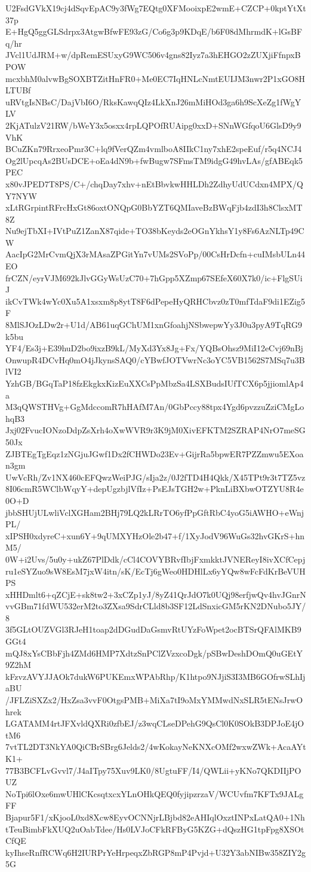 U2FsdGVkX19cj4dSqvEpAC9y3fWg7EQtg0XFMooixpE2wmE+CZCP+0kptYtXt37p
E+HgQ5ggGLSdrpx3AtgwBfwFE93zG/Co6g3p9KDqE/b6F08dMhrmdK+lGsBFq/hr
JVcl1UdJRM+w/dpRemESUxyG9WC506v4gns82Iyz7a3hEHGO2zZUXjiFfnpxBPOW
mcxbhM0alvwBgSOXBTZitHnFR0+Me0EC7IqHNLcNmtEUIJM3nwr2P1xGO8HLTUBf
uRVtgIsNBsC/DajVbI6O/RksKawqQIz4LkXnJ26mMiHOd3ga6h9ScXeZg1fWgYLV
2KjATulzV21RW/bWeY3x5osxx4rpLQPOfRUAipg0xxD+SNnWGfqoU6GlsD9y9VhK
BCuZKn79RrxeoPmr3C+lq9fVerQZm4vmlboA8IIkC1ny7xhE2speEuf/r5q4NCJ4
Og2lUpcqAs2BUsDCE+oEa4dN9b+fwBugw7SFmsTM9idgG49hvLAs/gfABEqk5PEC
x80vJPED7T8PS/C+/chqDay7xhv+nEtBbvkwHHLDh2ZdhyUdUCdxn4MPX/QY7NYW
xLtRGrpintRFrcHxGt86oxtONQpG0BbYZT6QMIaveBzBWqFjb4zdI3h8ClsxMT8Z
Nu9ejTbXI+IVtPuZ1ZanX87qide+TO38bKeyds2eOGnYkhsY1y8Fs6AzNLTp49CW
AacIpG2MrCvmQjX3rMAsaZPGitYn7vUMs2SVoPp/00CsHrDcfn+cuIMsbULn44EO
frCZN/eyrVJM692kJlvGGyWsUzC70+7hGpp5XZmp67SEfeX60X7k0/ic+FlgSUiJ
ikCvTWk4wYc0Xu5A1xsxm8p8ytT8F6dPepeHyQRHCbvz0zT0mfTdaF9di1EZig5F
8MlSJOzLDw2r+U1d/AB61uqGChUM1xnGfoahjNSbwepwYy3J0u3pyA9TqRG9k5bu
YF4/Es3j+E39huD2bo9ixzB9kL/MyXd3Yx8Jg+Fx/YQBsOhsz9MiI12eCvj69nBj
OnwupR4DCvHq0mO4jJkynsSAQ0/cYBwfJOTVwrNc3oYC5VB1562S7MSq7u3BlVI2
YzhGB/BGqTaP18fzEkgkxKizEuXXCsPpMbzSa4LSXBudsIUfTCX6p5jjiomlAp4a
M3qQWSTHVg+GgMdccomR7hHAfM7An/0GbPccy88tpx4Ygd6pvzzuZziCMgLohqB3
Jxj02FvucIONzoDdpZsXrh4oXwWVR9r3K9jM0XivEFKTM2SZRAP4NrO7meSG50Jx
ZJBTEgTgEqz1zNGjuJGwf1Dx2fCHWDo23Ev+GijrRa5bpwER7PZZmwu5EXoan3gm
UwVcRh/Zv1NX460cEFQwzWeiPJG/sIja2z/0J2fTD4H4Qkk/X45TPt9r3t7TZ5vz
8I06cmR5WClbWqyY+depUgzbjlVfIz+PsEJsTGH2w+PknLiBXbwOTZYU8R4e0O+D
jbbSHUjULwliVclXGHam2BHj79LQ2kLRrTO6yfPpGftRbC4yoG5iAWHO+eWnjPL/
xIPSH0xdyreC+xun6Y+9qUMXYHzOle2b47+f/1XyJodV96WuGs32hvGKrS+hnM5/
0W+i2Uvs/5u0y+ukZ67PlDdk/cCl4COVYBRvfIbjFxmkktJVNEReyI8ivXCfCepj
ru1eSYZuo9sW8EsM7jxW4itn/sK/EcTj6gWeo0HDHlLx6yYQw8wFcFdKrBeVUHPS
xHHDmlt6+qZCjE+sk8tw2+3xCZp1yJ/8yZ41QrJdO7k0UQj98erfjwQv4hvJGnrN
vvGBm71fdWU532erM2to3ZXsa9SdrCLld8b3SF12LdSnxicGM5rKN2DNubo5JY/8
3f5GLtOUZVGl3RJeH1toap2dDGudDaGsmvRtUYzFoWpet2ocBTSrQFAlMKB9GGt4
mQJ8xYsCBbFjh4ZMd6HMP7XdtzSnPClZVzxcoDgk/pSBwDeshDOmQ0uGEtY9Z2hM
kFzvzAVYJJAOk7dukW6PUKEmxWPAbRhp/K1htpo9NJjiS3I3MB6GOfrwSLhIjaBU
/JFLZiSXZx2/HxZsa3vvF0OtgsPMB+MiXa7tI9oMxYMMwdNxSLR5tENsJrwOhrek
LGATAMM4rtJFXvldQXRi0zfbEJ/z3wqCLseDPehG9QsCl0K0SOkB3DPJoE4jOtM6
7vtTL2DT3NkYA0QiCBrSBrg6Jelds2/4wKokayNeKNXcOMf2wxwZWk+AcaAYtK1+
77B3BCFLvGvvl7/J4aITpy75Xuv9LK0/8UgtuFF/I4/QWLii+yKNo7QKDIIjPOUZ
NoTpi6lOxe6mwUHlCKcsqtxcxYLnOHkQEQ0fyjipzrzaV/WCUvfm7KFTx9JALgFF
Bjapur5F1/xKjooL0xd8Xcw8EyvOCNNjrLBjbd82eAHIqlOxztINPxLatQA0+1Nh
tTeuBimbFkXUQ2uOabTdee/Hs0LVJoCFkRFByG5KZG+dQszHG1tpFpg8XSOtCfQE
kyIhseRnfRCWq6H2IURPrYeHrpeqxZbRGP8mP4Pvjd+U32Y3abNIBw358ZIY2g5G
